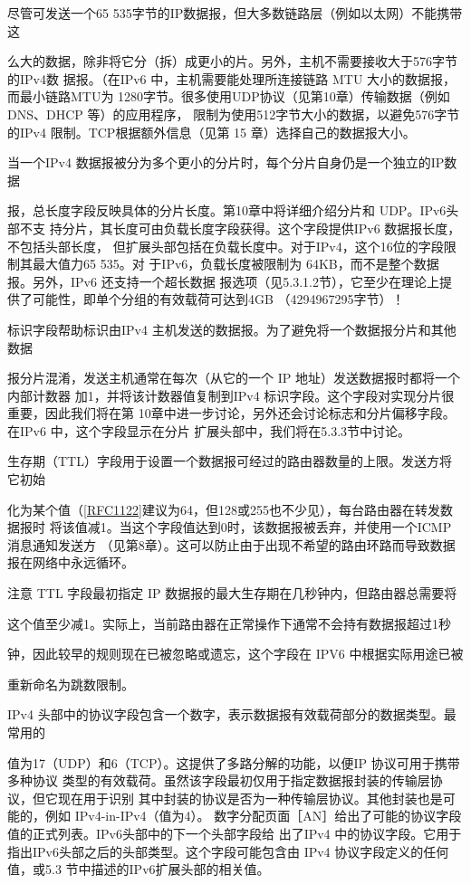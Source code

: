 尽管可发送一个65 535字节的IP数据报，但大多数链路层（例如以太网）不能携带这

么大的数据，除非将它分（拆）成更小的片。另外，主机不需要接收大于576字节的IPv4数
据报。（在IPv6 中，主机需要能处理所连接链路 MTU 大小的数据报，而最小链路MTU为
1280字节。很多使用UDP协议（见第10章）传输数据（例如 DNS、DHCP 等）的应用程序，
限制为使用512字节大小的数据，以避免576字节的IPv4 限制。TCP根据额外信息（见第
15 章）选择自己的数据报大小。

当一个IPv4 数据报被分为多个更小的分片时，每个分片自身仍是一个独立的IP数据

报，总长度字段反映具体的分片长度。第10章中将详细介绍分片和 UDP。IPv6头部不支
持分片，其长度可由负载长度字段获得。这个字段提供IPv6 数据报长度，不包括头部长度，
但扩展头部包括在负载长度中。对于IPv4，这个16位的字段限制其最大值力65 535。对
于IPv6，负载长度被限制为 64KB，而不是整个数据报。另外，IPv6 还支持一个超长数据
报选项（见5.3.1.2节），它至少在理论上提供了可能性，即单个分组的有效载荷可达到4GB
（4294967295字节）！

标识字段帮助标识由IPv4 主机发送的数据报。为了避免将一个数据报分片和其他数据

报分片混淆，发送主机通常在每次（从它的一个 IP 地址）发送数据报时都将一个内部计数器
加1，并将该计数器值复制到IPv4 标识字段。这个字段对实现分片很重要，因此我们将在第
10章中进一步讨论，另外还会讨论标志和分片偏移字段。在IPv6 中，这个字段显示在分片
扩展头部中，我们将在5.3.3节中讨论。

生存期（TTL）字段用于设置一个数据报可经过的路由器数量的上限。发送方将它初始

化为某个值（\href{https://www.rfc-editor.org/rfc/rfc1122}{[RFC1122]}建议为64，但128或255也不少见），每台路由器在转发数据报时
将该值减1。当这个字段值达到0时，该数据报被丢弃，并使用一个ICMP消息通知发送方
（见第8章）。这可以防止由于出现不希望的路由环路而导致数据报在网络中永远循环。

注意 TTL 字段最初指定 IP 数据报的最大生存期在几秒钟内，但路由器总需要将

这个值至少减1。实际上，当前路由器在正常操作下通常不会持有数据报超过1秒

钟，因此较早的规则现在已被忽略或遗忘，这个字段在 IPV6 中根据实际用途已被

重新命名为跳数限制。

IPv4 头部中的协议字段包含一个数字，表示数据报有效载荷部分的数据类型。最常用的

值为17（UDP）和6（TCP）。这提供了多路分解的功能，以便IP 协议可用于携带多种协议
类型的有效载荷。虽然该字段最初仅用于指定数据报封装的传输层协议，但它现在用于识别
其中封装的协议是否为一种传输层协议。其他封装也是可能的，例如 IPv4-in-IPv4（值为4）。
数字分配页面［AN］给出了可能的协议字段值的正式列表。IPv6头部中的下一个头部字段给
出了IPv4 中的协议字段。它用于指出IPv6头部之后的头部类型。这个字段可能包含由 IPv4
协议字段定义的任何值，或5.3 节中描述的IPv6扩展头部的相关值。


